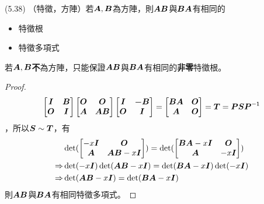 \item \begin{theorem}{(5.38)} （特徵，方陣）若$\boldsymbol{A}, \boldsymbol{B}$為方陣，則$\boldsymbol{AB}$與$\boldsymbol{BA}$有相同的
	\begin{itemize}
		\item 特徵根
		\item 特徵多項式
	\end{itemize}
	若$\boldsymbol{A}, \boldsymbol{B}$\textbf{不}為方陣，只能保證$\boldsymbol{AB}$與$\boldsymbol{BA}$有相同的\textbf{非零}特徵根。 \\
	\begin{proof} \begin{equation}
			\begin{bmatrix}
				\boldsymbol{I} & \boldsymbol{B} \\
				\boldsymbol{O} & \boldsymbol{I}
			\end{bmatrix}
			\begin{bmatrix}
				\boldsymbol{O} & \boldsymbol{O} \\
				\boldsymbol{A} & \boldsymbol{AB}
			\end{bmatrix}
			\begin{bmatrix}
				\boldsymbol{I} & \boldsymbol{-B} \\
				\boldsymbol{O} & \boldsymbol{I}
			\end{bmatrix} = 
			\begin{bmatrix}
				\boldsymbol{BA} & \boldsymbol{O} \\
				\boldsymbol{A} & \boldsymbol{O}
			\end{bmatrix} = \boldsymbol{T} = \boldsymbol{P}\boldsymbol{S}\boldsymbol{P}^{\mathsf{-1}}
		\end{equation}，所以$\boldsymbol{S} \sim \boldsymbol{T}$，有\begin{equation}
			\begin{aligned} 
				& \det(\begin{bmatrix}
					-x\boldsymbol{I} & \boldsymbol{O} \\
					\boldsymbol{A} & \boldsymbol{AB} - x\boldsymbol{I}
				\end{bmatrix}) = 
				\det(\begin{bmatrix}
					\boldsymbol{BA} - x\boldsymbol{I} & \boldsymbol{O} \\
					\boldsymbol{A} & -x\boldsymbol{I}
				\end{bmatrix}) \\
				\Rightarrow & \det(-x\boldsymbol{I})\det(\boldsymbol{AB} - x\boldsymbol{I}) = \det(\boldsymbol{BA} - x\boldsymbol{I})\det(-x\boldsymbol{I}) \\
				\Rightarrow & \det(\boldsymbol{AB} - x\boldsymbol{I}) = \det(\boldsymbol{BA} - x\boldsymbol{I})
			\end{aligned}
		\end{equation} 則$\boldsymbol{AB}$與$\boldsymbol{BA}$有相同特徵多項式。
	\end{proof}
\end{theorem}

